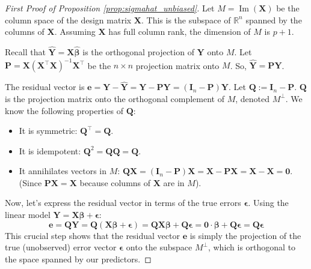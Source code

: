 \documentclass[11pt, letterpaper]{article}
\theoremstyle{definition}
\theoremstyle{plain} %
\theoremstyle{remark}
\newcommand{\ImSpace}{\operatorname{Im}}%
\newcommand{\vb}[1]{\bm{#1}}          %
\newcommand{\mb}[1]{\bm{#1}}          %
\newcommand{\Yvec}{\vb{Y}}            %
\newcommand{\Xmat}{\mb{X}}            %
\newcommand{\Qmat}{\mb{Q}}            %
\newcommand{\Pmat}{\mb{P}}            %
\newcommand{\Imat}{\mb{I}}            %
\newcommand{\betavec}{\vb{\beta}}     %
\newcommand{\epsilonvec}{\vb{\epsilon}}%
\newcommand{\evec}{\vb{e}}            %
\newcommand{\Yhatvec}{\vb{\hat{Y}}}    %
\newcommand{\betahatvec}{\vb{\hat{\beta}}}%
\newcommand{\zerovec}{\vb{0}}        %
\begin{document}
\begin{proof}[First Proof of Proposition \ref{prop:sigmahat_unbiased}]
Let $M = \ImSpace(\Xmat)$ be the column space of the design matrix $\Xmat$. This is the subspace of $\mathbb{R}^n$ spanned by the columns of $\Xmat$. Assuming $\Xmat$ has full column rank, the dimension of $M$ is $p+1$.

Recall that $\Yhatvec = \Xmat\betahatvec$ is the orthogonal projection of $\Yvec$ onto $M$. Let $\Pmat = \Xmat(\Xmat^\top \Xmat)^{-1}\Xmat^\top$ be the $n \times n$ projection matrix onto $M$. So, $\Yhatvec = \Pmat\Yvec$.

The residual vector is $\evec = \Yvec - \Yhatvec = \Yvec - \Pmat\Yvec = (\Imat_n - \Pmat)\Yvec$.
Let $\Qmat := \Imat_n - \Pmat$. $\Qmat$ is the projection matrix onto the orthogonal complement of $M$, denoted $M^\perp$. We know the following properties of $\Qmat$:
\begin{itemize}
    \item It is symmetric: $\Qmat^\top = \Qmat$.
    \item It is idempotent: $\Qmat^2 = \Qmat\Qmat = \Qmat$.
    \item It annihilates vectors in $M$: $\Qmat\Xmat = (\Imat_n - \Pmat)\Xmat = \Xmat - \Pmat\Xmat = \Xmat - \Xmat = \mb{0}$. (Since $\Pmat\Xmat = \Xmat$ because columns of $\Xmat$ are in $M$).
\end{itemize}
Now, let's express the residual vector in terms of the true errors $\epsilonvec$. Using the linear model $\Yvec = \Xmat\betavec + \epsilonvec$:
\[
\evec = \Qmat\Yvec = \Qmat(\Xmat\betavec + \epsilonvec) = \Qmat\Xmat\betavec + \Qmat\epsilonvec = \zerovec \cdot \betavec + \Qmat\epsilonvec = \Qmat\epsilonvec
\]
This crucial step shows that the residual vector $\evec$ is simply the projection of the true (unobserved) error vector $\epsilonvec$ onto the subspace $M^\perp$, which is orthogonal to the space spanned by our predictors.


\end{proof}
\end{document}
